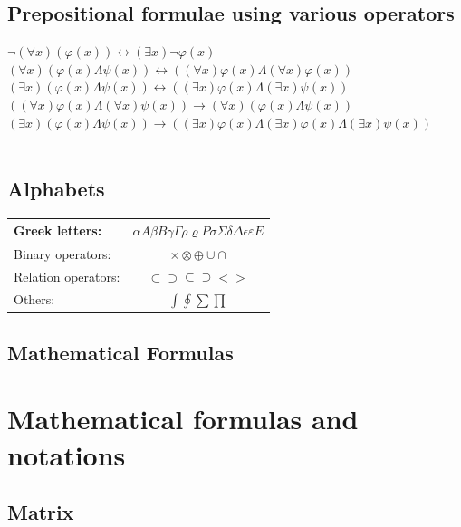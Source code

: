 \documentclass{article}
\begin{document}
\subsection{Prepositional formulae using various operators}
$\neg(\forall x)(\varphi(x)) \longleftrightarrow (\exists x)\neg\varphi(x)$ \\
$(\forall x)(\varphi(x)\Lambda\psi(x)) \longleftrightarrow ((\forall x)\varphi(x)\Lambda(\forall x)\varphi(x))$ \\
$(\exists x)(\varphi(x)\Lambda\psi(x)) \longleftrightarrow ((\exists x)\varphi(x)\Lambda(\exists x)\psi(x))$\\
$((\forall x)\varphi(x)\Lambda(\forall x)\psi(x)) \longrightarrow (\forall x)(\varphi(x)\Lambda\psi(x))$\\
$(\exists x)(\varphi(x)\Lambda\psi(x)) \longrightarrow  ((\exists x)\varphi(x)\Lambda(\exists x)\varphi(x)\Lambda(\exists x)\psi(x))$\\
\\


\subsection{Alphabets}

\begin{table}[H]
\centering
\begin{tabular} {| l | c |}
\hline
Greek letters: &
$\alpha  A  \beta  B \gamma \Gamma \rho \varrho P  \sigma \Sigma  \delta \Delta \epsilon  \varepsilon  E $\\
\hline
Binary operators: &
$\times \otimes \oplus \cup \cap$ \\
\hline
Relation operators:&
$\subset \supset \subseteq \supseteq < >  $\\
\hline
Others:&
$\int \oint \sum \prod$\\
\hline
\end{tabular}
\end{table}


\subsection{Mathematical Formulas}

\section{Mathematical formulas and notations}
\subsection{Matrix}
\end{document}
